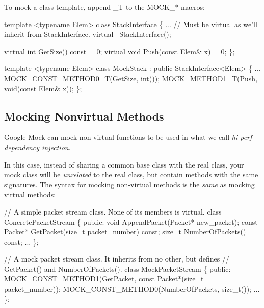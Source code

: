 To mock a class template, append {\ttfamily \+\_\+T} to the {\ttfamily M\+O\+C\+K\+\_\+$\ast$} macros\+:


\begin{DoxyCode}
\textcolor{keyword}{template} <\textcolor{keyword}{typename} Elem>
\textcolor{keyword}{class }StackInterface \{
  ...
  \textcolor{comment}{// Must be virtual as we'll inherit from StackInterface.}
  \textcolor{keyword}{virtual} ~StackInterface();

  \textcolor{keyword}{virtual} \textcolor{keywordtype}{int} GetSize() \textcolor{keyword}{const} = 0;
  \textcolor{keyword}{virtual} \textcolor{keywordtype}{void} Push(\textcolor{keyword}{const} Elem& x) = 0;
\};

\textcolor{keyword}{template} <\textcolor{keyword}{typename} Elem>
\textcolor{keyword}{class }MockStack : \textcolor{keyword}{public} StackInterface<Elem> \{
  ...
  MOCK\_CONST\_METHOD0\_T(GetSize, \textcolor{keywordtype}{int}());
  MOCK\_METHOD1\_T(Push, \textcolor{keywordtype}{void}(\textcolor{keyword}{const} Elem& x));
\};
\end{DoxyCode}


\subsection*{Mocking Nonvirtual Methods}

Google Mock can mock non-\/virtual functions to be used in what we call {\itshape hi-\/perf dependency injection}.

In this case, instead of sharing a common base class with the real class, your mock class will be {\itshape unrelated} to the real class, but contain methods with the same signatures. The syntax for mocking non-\/virtual methods is the {\itshape same} as mocking virtual methods\+:


\begin{DoxyCode}
\textcolor{comment}{// A simple packet stream class.  None of its members is virtual.}
\textcolor{keyword}{class }ConcretePacketStream \{
 \textcolor{keyword}{public}:
  \textcolor{keywordtype}{void} AppendPacket(Packet* new\_packet);
  \textcolor{keyword}{const} Packet* GetPacket(\textcolor{keywordtype}{size\_t} packet\_number) \textcolor{keyword}{const};
  \textcolor{keywordtype}{size\_t} NumberOfPackets() \textcolor{keyword}{const};
  ...
\};

\textcolor{comment}{// A mock packet stream class.  It inherits from no other, but defines}
\textcolor{comment}{// GetPacket() and NumberOfPackets().}
\textcolor{keyword}{class }MockPacketStream \{
 \textcolor{keyword}{public}:
  MOCK\_CONST\_METHOD1(GetPacket, \textcolor{keyword}{const} Packet*(\textcolor{keywordtype}{size\_t} packet\_number));
  MOCK\_CONST\_METHOD0(NumberOfPackets, \textcolor{keywordtype}{size\_t}());
  ...
\};
\end{DoxyCode}


